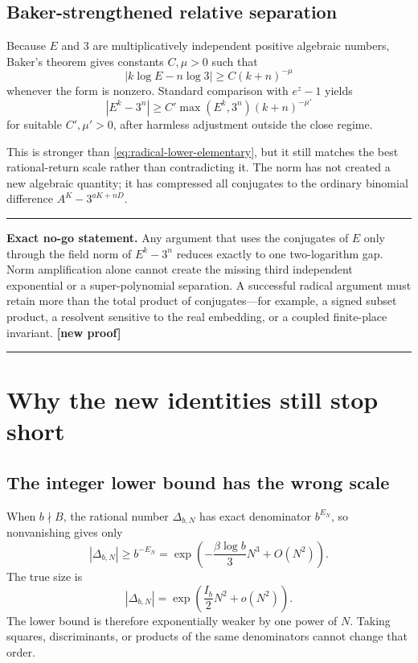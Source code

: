 \documentclass[11pt,oneside]{article}
\theoremstyle{definition}
\theoremstyle{remark}
\newcommand{\statusnew}{\textcolor{deepgreen}{\textbf{[new proof]}}}
\newenvironment{resultbox}
  {\begin{center}\begin{minipage}{0.93\textwidth}\hrule\vspace{0.65em}}
  {\vspace{0.45em}\hrule\end{minipage}\end{center}}
\begin{document}
\subsection{Baker-strengthened relative separation}

Because $E$ and $3$ are multiplicatively independent positive algebraic numbers, Baker's
theorem gives constants $C,\mu>0$ such that
\begin{equation}
 |k\log E-n\log3|\ge C(k+n)^{-\mu}
 \label{eq:Baker-E}
\end{equation}
whenever the form is nonzero.  Standard comparison with $e^z-1$ yields
\begin{equation}
 |E^k-3^n|
 \ge C'\max(E^k,3^n)(k+n)^{-\mu'}
 \label{eq:relative-radical}
\end{equation}
for suitable $C',\mu'>0$, after harmless adjustment outside the close regime.

This is stronger than \eqref{eq:radical-lower-elementary}, but it still matches the best
rational-return scale rather than contradicting it.  The norm has not created a new algebraic
quantity; it has compressed all conjugates to the ordinary binomial difference
$A^K-3^{aK+nD}$.

\begin{resultbox}
\textbf{Exact no-go statement.}  Any argument that uses the conjugates of $E$ only through the
field norm of $E^k-3^n$ reduces exactly to one two-logarithm gap.  Norm amplification alone
cannot create the missing third independent exponential or a super-polynomial separation.
A successful radical argument must retain more than the total product of conjugates---for
example, a signed subset product, a resolvent sensitive to the real embedding, or a coupled
finite-place invariant.  \statusnew
\end{resultbox}

\section{Why the new identities still stop short}
\label{sec:failure}

\subsection{The integer lower bound has the wrong scale}

When $b\nmid B$, the rational number $\Delta_{b,N}$ has exact denominator
$b^{E_N}$, so nonvanishing gives only
\[
 |\Delta_{b,N}|\ge b^{-E_N}
 =\exp\left(-\frac{\beta\log b}{3}N^3+O(N^2)\right).
\]
The true size is
\[
 |\Delta_{b,N}|=
 \exp\left(\frac{I_b}{2}N^2+o(N^2)\right).
\]
The lower bound is therefore exponentially weaker by one power of $N$.  Taking squares,
discriminants, or products of the same denominators cannot change that order.
\end{document}
